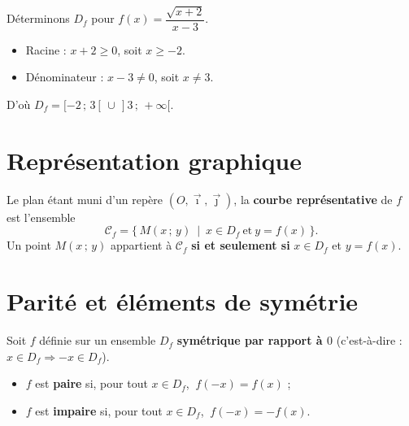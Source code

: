 \begin{exemple}
Déterminons $D_f$ pour $f(x)=\dfrac{\sqrt{x+2}}{x-3}$.
\begin{itemize}
  \item Racine : $x+2\ge 0$, soit $x\ge -2$.
  \item Dénominateur : $x-3\neq 0$, soit $x\neq 3$.
\end{itemize}
D'où $D_f = [-2\,;\,3[\,\cup\,]3\,;\,+\infty[$.
\end{exemple}

\section{Représentation graphique}

\begin{definition}
Le plan étant muni d'un repère $(O,\vec{\imath},\vec{\jmath})$, la \textbf{courbe
représentative} de $f$ est l'ensemble
\[ \mathcal{C}_f = \big\{\, M(x\,;\,y)\ \mid\ x\in D_f \ \text{et}\ y=f(x) \,\big\}. \]
Un point $M(x\,;\,y)$ appartient à $\mathcal{C}_f$ \textbf{si et seulement si}
$x\in D_f$ et $y=f(x)$.
\end{definition}

\begin{illus}
\end{illus}

\section{Parité et éléments de symétrie}

\begin{definition}
Soit $f$ définie sur un ensemble $D_f$ \textbf{symétrique par rapport à $0$}
(c'est-à-dire : $x\in D_f \Rightarrow -x\in D_f$).
\begin{itemize}
  \item $f$ est \textbf{paire} si, pour tout $x\in D_f$, $\ f(-x)=f(x)$ ;
  \item $f$ est \textbf{impaire} si, pour tout $x\in D_f$, $\ f(-x)=-f(x)$.
\end{itemize}
\end{definition}

